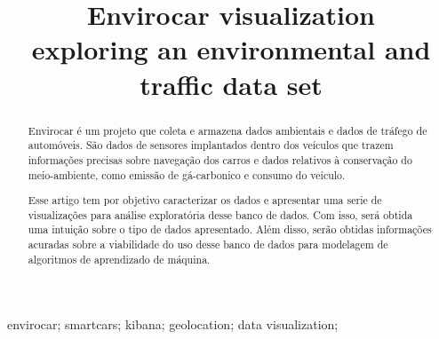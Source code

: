 \documentclass[10pt, conference]{IEEEtran}
\begin{document}
%
\title{Envirocar visualization \\ exploring an environmental and traffic data set}

\newif\iffinal
\finaltrue
\newcommand{\jemsid}{99999}


\iffinal
  \author{%
  }
\else
  \author{Sibgrapi paper ID: \jemsid \\ }
\fi


\maketitle


\begin{abstract}
Envirocar é um projeto que coleta e armazena dados ambientais e dados de tráfego
de automóveis. 
São dados de sensores implantados dentro dos veículos que trazem informações
precisas sobre navegação dos carros e dados relativos à conservação do meio-ambiente, 
como emissão de gá-carbonico e consumo do veículo. 

Esse artigo tem por objetivo caracterizar os dados e apresentar uma serie de 
visualizações para análise exploratória desse banco de dados. Com isso, será
obtida uma intuição sobre o tipo de dados apresentado. Além disso, serão obtidas
informações acuradas sobre a viabilidade do uso desse banco de dados para modelagem
de algoritmos de aprendizado de máquina.

%
\end{abstract}

\begin{IEEEkeywords}
envirocar; smartcars; kibana; geolocation; data visualization;

\end{IEEEkeywords}
\end{document}
